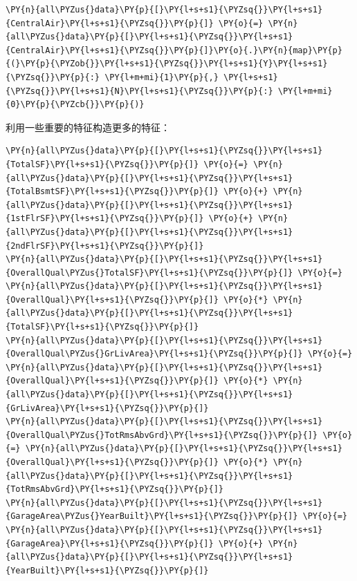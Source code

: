 \documentclass[no-math]{YangThesis}
\begin{document}
\begin{tcolorbox}[breakable, size=fbox, boxrule=1pt, pad at break*=1mm,colback=cellbackground, colframe=cellborder]
\begin{Verbatim}[commandchars=\\\{\}]
\PY{n}{all\PYZus{}data}\PY{p}{[}\PY{l+s+s1}{\PYZsq{}}\PY{l+s+s1}{CentralAir}\PY{l+s+s1}{\PYZsq{}}\PY{p}{]} \PY{o}{=} \PY{n}{all\PYZus{}data}\PY{p}{[}\PY{l+s+s1}{\PYZsq{}}\PY{l+s+s1}{CentralAir}\PY{l+s+s1}{\PYZsq{}}\PY{p}{]}\PY{o}{.}\PY{n}{map}\PY{p}{(}\PY{p}{\PYZob{}}\PY{l+s+s1}{\PYZsq{}}\PY{l+s+s1}{Y}\PY{l+s+s1}{\PYZsq{}}\PY{p}{:} \PY{l+m+mi}{1}\PY{p}{,} \PY{l+s+s1}{\PYZsq{}}\PY{l+s+s1}{N}\PY{l+s+s1}{\PYZsq{}}\PY{p}{:} \PY{l+m+mi}{0}\PY{p}{\PYZcb{}}\PY{p}{)}
	\end{Verbatim}
\end{tcolorbox}

利用一些重要的特征构造更多的特征：

\begin{tcolorbox}[breakable, size=fbox, boxrule=1pt, pad at break*=1mm,colback=cellbackground, colframe=cellborder]
	\begin{Verbatim}[commandchars=\\\{\}]
\PY{n}{all\PYZus{}data}\PY{p}{[}\PY{l+s+s1}{\PYZsq{}}\PY{l+s+s1}{TotalSF}\PY{l+s+s1}{\PYZsq{}}\PY{p}{]} \PY{o}{=} \PY{n}{all\PYZus{}data}\PY{p}{[}\PY{l+s+s1}{\PYZsq{}}\PY{l+s+s1}{TotalBsmtSF}\PY{l+s+s1}{\PYZsq{}}\PY{p}{]} \PY{o}{+} \PY{n}{all\PYZus{}data}\PY{p}{[}\PY{l+s+s1}{\PYZsq{}}\PY{l+s+s1}{1stFlrSF}\PY{l+s+s1}{\PYZsq{}}\PY{p}{]} \PY{o}{+} \PY{n}{all\PYZus{}data}\PY{p}{[}\PY{l+s+s1}{\PYZsq{}}\PY{l+s+s1}{2ndFlrSF}\PY{l+s+s1}{\PYZsq{}}\PY{p}{]}
\PY{n}{all\PYZus{}data}\PY{p}{[}\PY{l+s+s1}{\PYZsq{}}\PY{l+s+s1}{OverallQual\PYZus{}TotalSF}\PY{l+s+s1}{\PYZsq{}}\PY{p}{]} \PY{o}{=} \PY{n}{all\PYZus{}data}\PY{p}{[}\PY{l+s+s1}{\PYZsq{}}\PY{l+s+s1}{OverallQual}\PY{l+s+s1}{\PYZsq{}}\PY{p}{]} \PY{o}{*} \PY{n}{all\PYZus{}data}\PY{p}{[}\PY{l+s+s1}{\PYZsq{}}\PY{l+s+s1}{TotalSF}\PY{l+s+s1}{\PYZsq{}}\PY{p}{]}
\PY{n}{all\PYZus{}data}\PY{p}{[}\PY{l+s+s1}{\PYZsq{}}\PY{l+s+s1}{OverallQual\PYZus{}GrLivArea}\PY{l+s+s1}{\PYZsq{}}\PY{p}{]} \PY{o}{=} \PY{n}{all\PYZus{}data}\PY{p}{[}\PY{l+s+s1}{\PYZsq{}}\PY{l+s+s1}{OverallQual}\PY{l+s+s1}{\PYZsq{}}\PY{p}{]} \PY{o}{*} \PY{n}{all\PYZus{}data}\PY{p}{[}\PY{l+s+s1}{\PYZsq{}}\PY{l+s+s1}{GrLivArea}\PY{l+s+s1}{\PYZsq{}}\PY{p}{]}
\PY{n}{all\PYZus{}data}\PY{p}{[}\PY{l+s+s1}{\PYZsq{}}\PY{l+s+s1}{OverallQual\PYZus{}TotRmsAbvGrd}\PY{l+s+s1}{\PYZsq{}}\PY{p}{]} \PY{o}{=} \PY{n}{all\PYZus{}data}\PY{p}{[}\PY{l+s+s1}{\PYZsq{}}\PY{l+s+s1}{OverallQual}\PY{l+s+s1}{\PYZsq{}}\PY{p}{]} \PY{o}{*} \PY{n}{all\PYZus{}data}\PY{p}{[}\PY{l+s+s1}{\PYZsq{}}\PY{l+s+s1}{TotRmsAbvGrd}\PY{l+s+s1}{\PYZsq{}}\PY{p}{]}
\PY{n}{all\PYZus{}data}\PY{p}{[}\PY{l+s+s1}{\PYZsq{}}\PY{l+s+s1}{GarageArea\PYZus{}YearBuilt}\PY{l+s+s1}{\PYZsq{}}\PY{p}{]} \PY{o}{=} \PY{n}{all\PYZus{}data}\PY{p}{[}\PY{l+s+s1}{\PYZsq{}}\PY{l+s+s1}{GarageArea}\PY{l+s+s1}{\PYZsq{}}\PY{p}{]} \PY{o}{+} \PY{n}{all\PYZus{}data}\PY{p}{[}\PY{l+s+s1}{\PYZsq{}}\PY{l+s+s1}{YearBuilt}\PY{l+s+s1}{\PYZsq{}}\PY{p}{]}
	\end{Verbatim}
\end{tcolorbox}
\end{document}
